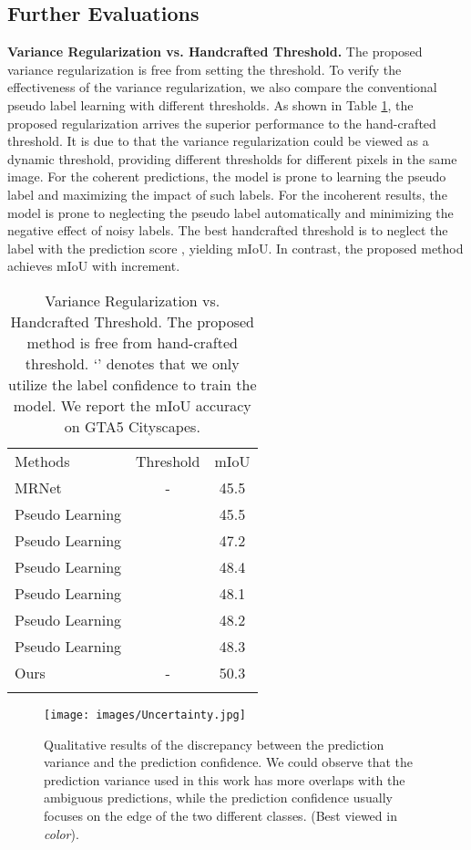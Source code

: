 \subsection{Further Evaluations}
\textbf{Variance Regularization vs. Handcrafted Threshold.} The proposed variance regularization is free from setting the threshold. To verify the effectiveness of the variance regularization, we also compare the conventional pseudo label learning with different thresholds. As shown in Table \ref{table:threshold}, the proposed regularization arrives the superior performance to the hand-crafted threshold. 
It is due to that the variance regularization could be viewed as a dynamic threshold, providing different thresholds for different pixels in the same image. For the coherent predictions, the model is prone to learning the pseudo label and maximizing the impact of such labels. 
For the incoherent results, the model is prone to neglecting the pseudo label automatically and minimizing the negative effect of noisy labels. 
The best handcrafted threshold is to neglect the label with the prediction score , yielding  mIoU. In contrast, the proposed method achieves  mIoU with  increment. 

\setlength{\tabcolsep}{10pt}
\begin{table}
\footnotesize
\begin{center}
\begin{tabular}{l|c|c}
\shline
Methods  & Threshold & mIoU \\
\shline
MRNet \cite{zheng2019unsupervised}  & - &  45.5 \\
\hline
Pseudo Learning &  & 45.5 \\
Pseudo Learning &  & 47.2 \\
Pseudo Learning &  & 48.4 \\
Pseudo Learning &  & 48.1 \\
Pseudo Learning &  & 48.2 \\
Pseudo Learning &  & 48.3 \\
\hline
Ours & - & 50.3 \\
\shline
\end{tabular}
\end{center}
\caption{Variance Regularization vs. Handcrafted Threshold. The proposed method is free from hand-crafted threshold. `' denotes that we only utilize the label confidence  to train the model. We report the mIoU accuracy on GTA5  Cityscapes.}
\label{table:threshold}
\end{table}

\begin{figure*}[t]
\begin{center}
     \texttt{[image: images/Uncertainty.jpg]}
\end{center} 
      \caption{  Qualitative results of the discrepancy between the prediction variance and the prediction confidence. We could observe that the prediction variance used in this work has more overlaps with the ambiguous predictions, while the prediction confidence usually focuses on the edge of the two different classes. (Best viewed in \emph{color}). }
      \label{fig:uncertain}
\end{figure*}


